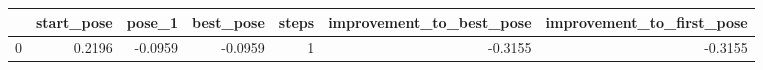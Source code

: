 \begin{tabular}{lrrrrrr}
\toprule
{} &  start\_pose &  pose\_1 &  best\_pose &  steps &  improvement\_to\_best\_pose &  improvement\_to\_first\_pose \\
\midrule
0 &      0.2196 & -0.0959 &    -0.0959 &      1 &                   -0.3155 &                    -0.3155 \\
\bottomrule
\end{tabular}
